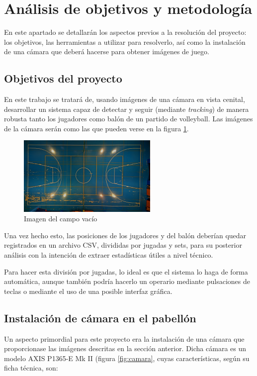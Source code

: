 \section{Análisis de objetivos y metodología}
En este apartado se detallarán los aspectos previos a la resolución del proyecto: los objetivos, las herramientas a utilizar para resolverlo, así como la instalación de una cámara que deberá hacerse para obtener imágenes de juego.

\subsection{Objetivos del proyecto}
En este trabajo se tratará de, usando imágenes de una cámara en vista cenital, desarrollar un sistema capaz de detectar y seguir (mediante \textit{tracking}) de manera robusta tanto los jugadores como balón de un partido de volleyball. Las imágenes de la cámara serán como las que pueden verse en la figura \ref{fig:campo}.

\begin{figure}
    \centering
    \includegraphics[width=0.6\textwidth]{images/campo}
    \caption{Imagen del campo vacío}
    \label{fig:campo}
\end{figure}

Una vez hecho esto, las posiciones de los jugadores y del balón deberían quedar registrados en un archivo CSV, divididas por jugadas y sets, para su posterior análisis con la intención de extraer estadísticas útiles a nivel técnico. 

Para hacer esta división por jugadas, lo ideal es que el sistema lo haga de forma automática, aunque también podría hacerlo un operario mediante pulsaciones de teclas o mediante el uso de una posible interfaz gráfica.

\subsection{Instalación de cámara en el pabellón}
Un aspecto primordial para este proyecto era la instalación de una cámara que proporcionase las imágenes descritas en la sección anterior. Dicha cámara es un modelo AXIS P1365-E Mk II (figura \ref{fig:camara}, cuyas características, según su ficha técnica, son:

